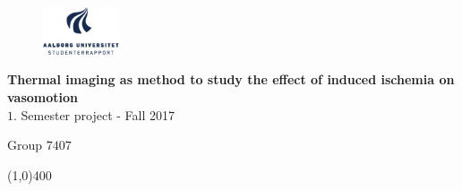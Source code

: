 \clearpage
\thispagestyle{empty}

\begin{figure}[H]
	\raggedleft
	\includegraphics[width=0.2\textwidth]{figures/aaulogo-da.png}
\end{figure} 

\vspace{5 cm}

\begin{center}	
	\begin{Huge}
		\textbf{Thermal imaging as method to study the effect of induced ischemia on vasomotion}\\
		\vspace{5 mm}
		$1.$ Semester project - Fall 2017\\
		\vspace{3 mm}
	\end{Huge}
	{\Large Group $7407$}
\end{center}
\vspace*{\fill}

\begin{center}
	\line(1,0){400}
\end{center}

